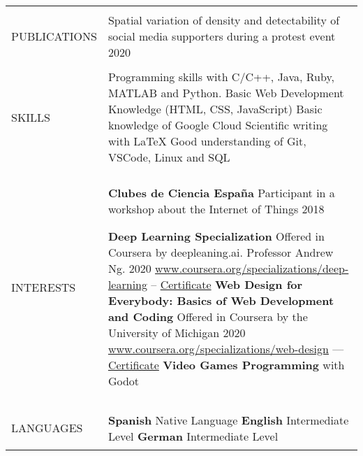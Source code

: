\documentclass[letterpaper,10pt,oneside]{article}
\newcommand{\DatestampY}[1]{#1}
\newenvironment{body}
{\par\par
\begin{longtable}{p{0.125\textwidth}p{0.84\textwidth}}}
{\par\end{longtable}\par}
\renewcommand{\section}[3]{\\[-0.7cm]\pdfbookmark[2]{#2}{#3}\\%
\raggedleft  %
{\fontsize{9.5pt}{9.5pt}\selectfont\bfseries\raggedright%
\MakeUppercase{#1}}&}
\newcommand{\SmallEntryGap}{\par\vspace{0.38em}\par}
\begin{document}
\begin{body}
\section{Publications}{Publications}{PDF:Publications} 
Spatial variation of density and detectability of social media supporters during a protest event \hfill \DatestampY{2020}
\SmallEntryGap


\section{Skills}{Skills}{PDF:Skills}
Programming skills with C/C++, Java, Ruby, MATLAB and Python. \newline
Basic Web Development Knowledge (HTML, CSS, JavaScript) \newline
Basic knowledge of Google Cloud \newline
Scientific writing with {\LaTeX} \newline
Good understanding of Git, VSCode, Linux and SQL

\SmallEntryGap

\section{Interests}{Interests}{PDF:Interests}

\textbf{Clubes de Ciencia España} Participant in a workshop about the Internet of Things \hfill \DatestampY{2018}

\textbf{Deep Learning Specialization} Offered in Coursera by deepleaning.ai. Professor Andrew Ng. \hfill \DatestampY{2020} \newline
\href{https://www.coursera.org/specializations/deep-learning} {www.coursera.org/specializations/deep-learning} -- \href{https://coursera.org/share/44729d6e28d0a25156f56e8acd12afd0} {Certificate} \newline
\textbf{Web Design for Everybody: Basics of Web Development and Coding} \newline
Offered in Coursera by the University of Michigan \hfill \DatestampY{2020} \newline
\href{https://www.coursera.org/specializations/web-design} {www.coursera.org/specializations/web-design} ---
\href{https://coursera.org/share/ed7f5949aed0f26df8e6530f35d117b2}{Certificate}	\newline
\textbf{Video Games Programming} with Godot 
\SmallEntryGap
\section{Languages}{Languages}{PDF:Languages}
\textbf{Spanish} Native Language \newline
\textbf{English} Intermediate Level	\newline
\textbf{German} Intermediate Level \newline
\end{body}
\end{document}
